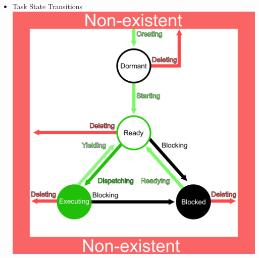 \begin{itemize}
    \item
      Task State Transitions \cite[\S5.2.5]{RTEMS:CUSER}
      \\
      \includegraphics[scale=0.3]{images/states.png}
\end{itemize}



